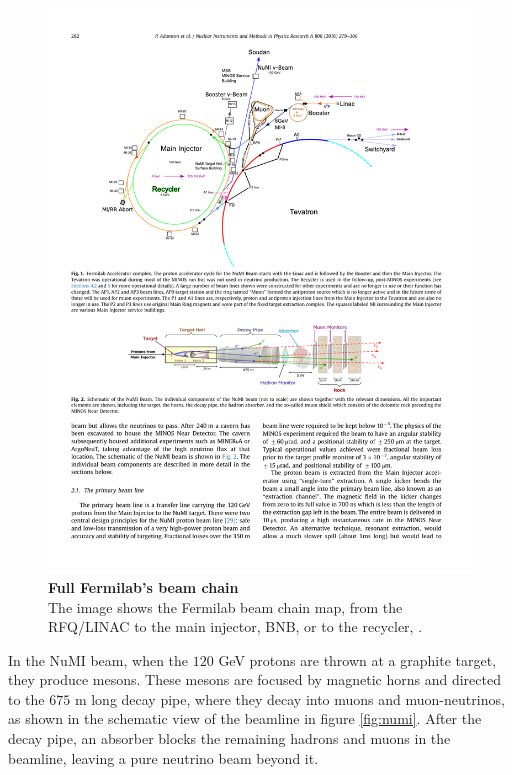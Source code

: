 \newpage
\begin{figure}[h!]
	\begin{center}
		\includegraphics[scale=0.8]{Figures/acceleratorChain.pdf}
		\caption[Full Fermilab's beam chain]{ {\textbf{Full Fermilab's beam chain}} \\ The image shows the Fermilab beam chain map, from the RFQ/LINAC to the main injector, BNB, or to the recycler, \cite{paper_numibeamline}.}
		\label{accelerator_chain}	
	\end{center}
\end{figure}
%

In the NuMI beam, when the $120$ GeV protons are thrown at a graphite target, they produce mesons. These mesons are focused by magnetic horns and directed to the $675$ m long decay pipe, where they decay into muons and muon-neutrinos, as shown in the schematic view of the beamline in figure \ref{fig:numi}. After the decay pipe, an absorber blocks the remaining hadrons and muons in the beamline, leaving a pure neutrino beam beyond it. 


